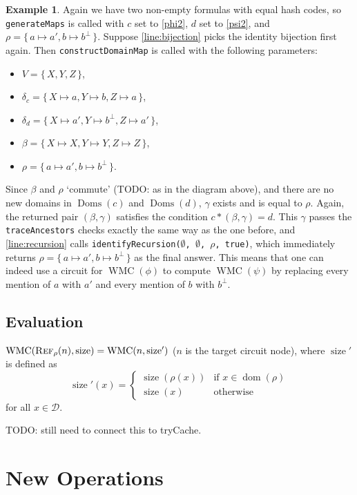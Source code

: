 \documentclass{article}
\theoremstyle{definition}
\newtheorem{example}{Example}
\DeclareMathOperator{\Reff}{\textsc{Ref}}
\DeclareMathOperator{\dom}{dom}
\DeclareMathOperator{\Doms}{Doms}
\DeclareMathOperator{\size}{size}
\DeclareMathOperator{\WMC}{WMC}
\begin{document}
\begin{example}
  Again we have two non-empty formulas with equal hash codes, so \texttt{generateMaps} is called with $c$ set to \cref{phi2}, $d$ set to \cref{psi2}, and $\rho = \{\, a \mapsto a', b \mapsto b^\bot \,\}$. Suppose \cref{line:bijection} picks the identity bijection first again. Then \texttt{constructDomainMap} is called with the following parameters:
  \begin{itemize}
  \item $V = \{\, X, Y, Z \,\}$,
  \item $\delta_c = \{\, X \mapsto a, Y \mapsto b, Z \mapsto a \,\}$,
  \item $\delta_d = \{\, X \mapsto a', Y \mapsto b^\bot, Z \mapsto a' \,\}$,
  \item $\beta = \{\, X \mapsto X, Y \mapsto Y, Z \mapsto Z \,\}$,
  \item $\rho = \{\, a \mapsto a', b \mapsto b^\bot \,\}$.
  \end{itemize}
  Since $\beta$ and $\rho$ `commute' (TODO: as in the diagram above), and there are no new domains in $\Doms(c)$ and $\Doms(d)$, $\gamma$ exists and is equal to $\rho$. Again, the returned pair $(\beta, \gamma)$ satisfies the condition $c \ast (\beta, \gamma) = d$. This $\gamma$ passes the \texttt{traceAncestors} checks exactly the same way as the one before, and \cref{line:recursion} calls \texttt{identifyRecursion($\emptyset$, $\emptyset$, $\rho$, true)}, which immediately returns $\rho = \{\, a \mapsto a', b \mapsto b^\bot \,\}$ as the final answer. This means that one can indeed use a circuit for $\WMC(\phi)$ to compute $\WMC(\psi)$ by replacing every mention of $a$ with $a'$ and every mention of $b$ with $b^\bot$.
\end{example}

\subsection{Evaluation}

$\WMC(\Reff_\rho(n), \size) = \WMC(n, \size')$ ($n$ is the target circuit node), where $\size'$ is defined as
\[
\size'(x) =
\begin{cases}
  \size(\rho(x)) & \text{if } x \in \dom(\rho) \\
  \size(x) & \text{otherwise}
\end{cases}
\]
for all $x \in \mathscr{D}$.

TODO: still need to connect this to tryCache.

\section{New Operations}
\end{document}
